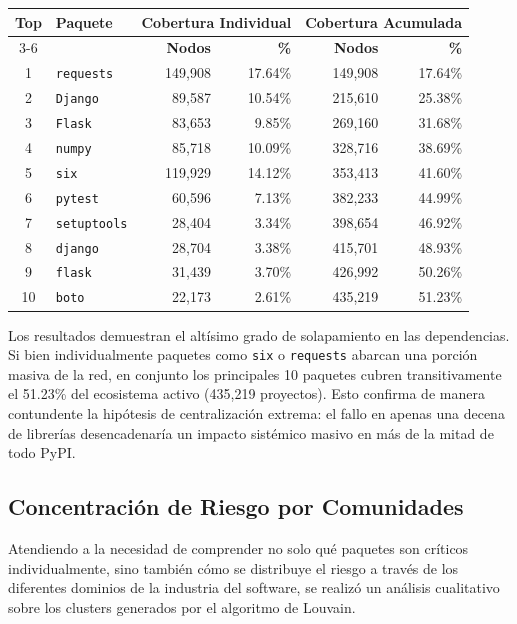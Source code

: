 \begin{center}
\begin{tabular}{clrr|rr}
\toprule
\multirow{2}{*}{\textbf{Top}} & \multirow{2}{*}{\textbf{Paquete}} & \multicolumn{2}{c|}{\textbf{Cobertura Individual}} & \multicolumn{2}{c}{\textbf{Cobertura Acumulada}} \\
\cmidrule{3-6}
 & & \textbf{Nodos} & \textbf{\%} & \textbf{Nodos} & \textbf{\%} \\
\midrule
1 & \texttt{requests} & 149,908 & 17.64\% & 149,908 & 17.64\% \\
2 & \texttt{Django} & 89,587 & 10.54\% & 215,610 & 25.38\% \\
3 & \texttt{Flask} & 83,653 & 9.85\% & 269,160 & 31.68\% \\
4 & \texttt{numpy} & 85,718 & 10.09\% & 328,716 & 38.69\% \\
5 & \texttt{six} & 119,929 & 14.12\% & 353,413 & 41.60\% \\
6 & \texttt{pytest} & 60,596 & 7.13\% & 382,233 & 44.99\% \\
7 & \texttt{setuptools} & 28,404 & 3.34\% & 398,654 & 46.92\% \\
8 & \texttt{django} & 28,704 & 3.38\% & 415,701 & 48.93\% \\
9 & \texttt{flask} & 31,439 & 3.70\% & 426,992 & 50.26\% \\
10 & \texttt{boto} & 22,173 & 2.61\% & 435,219 & 51.23\% \\
\bottomrule
\end{tabular}
\end{center}

Los resultados demuestran el altísimo grado de solapamiento en las dependencias. Si bien individualmente paquetes como \texttt{six} o \texttt{requests} abarcan una porción masiva de la red, en conjunto los principales 10 paquetes cubren transitivamente el 51.23\% del ecosistema activo (435,219 proyectos). Esto confirma de manera contundente la hipótesis de centralización extrema: el fallo en apenas una decena de librerías desencadenaría un impacto sistémico masivo en más de la mitad de todo PyPI.

\subsection{Concentración de Riesgo por Comunidades}
Atendiendo a la necesidad de comprender no solo qué paquetes son críticos individualmente, sino también cómo se distribuye el riesgo a través de los diferentes dominios de la industria del software, se realizó un análisis cualitativo sobre los clusters generados por el algoritmo de Louvain. 

